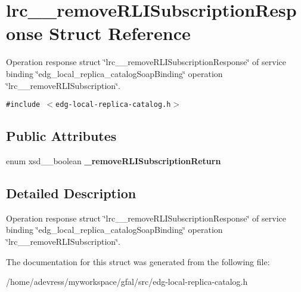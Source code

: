 \section{lrc\_\-\_\-remove\-RLISubscription\-Response Struct Reference}
\label{structlrc____removeRLISubscriptionResponse}
Operation response struct \char`\"{}lrc\_\-\_\-remove\-RLISubscription\-Response\char`\"{} of service binding \char`\"{}edg\_\-local\_\-replica\_\-catalog\-Soap\-Binding\char`\"{} operation \char`\"{}lrc\_\-\_\-remove\-RLISubscription\char`\"{}.  


{\tt \#include $<$edg-local-replica-catalog.h$>$}

\subsection*{Public Attributes}
\begin{CompactItemize}
\item 
enum xsd\_\-\_\-boolean \textbf{\_\-remove\-RLISubscription\-Return}\label{structlrc____removeRLISubscriptionResponse_2ecced25e01a2a66ac62d7a8bd77b47c}

\end{CompactItemize}


\subsection{Detailed Description}
Operation response struct \char`\"{}lrc\_\-\_\-remove\-RLISubscription\-Response\char`\"{} of service binding \char`\"{}edg\_\-local\_\-replica\_\-catalog\-Soap\-Binding\char`\"{} operation \char`\"{}lrc\_\-\_\-remove\-RLISubscription\char`\"{}. 



The documentation for this struct was generated from the following file:\begin{CompactItemize}
\item 
/home/adevress/myworkspace/gfal/src/edg-local-replica-catalog.h\end{CompactItemize}
